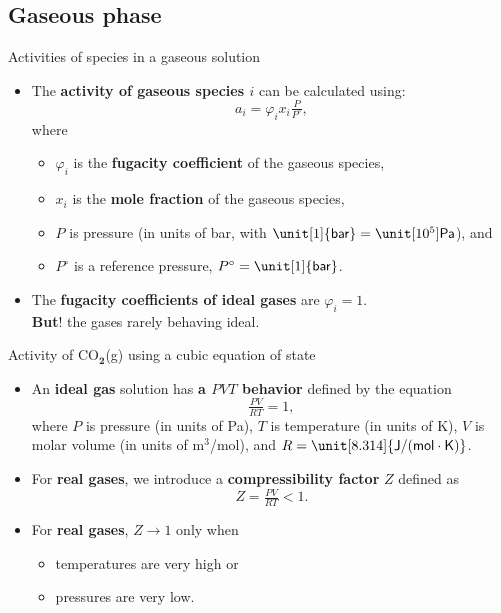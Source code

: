 \subsection{Gaseous phase}
%
%
\begin{frame}{Activities of species in a gaseous solution}
\begin{itemize}
\item The \alert{\textbf{activity of gaseous species $i$}} can be calculated using:
\[
\boxed{a_{i}=\varphi_{i}x_{i}\tfrac{P}{P^{\circ}}},
\]
where 
\begin{itemize}
\item $\varphi_{i}$ is the \textbf{fugacity coefficient} of the gaseous species,
\item $x_{i}$ is the \textbf{mole fraction} of the gaseous species,
\item $P$ is pressure (in units of bar, with $\unit[1]{\mathsf{bar}}=\unit[10^{5}]{\mathsf{Pa}}$),
and 
\item $P^{\circ}$ is a reference pressure, $P^{\circ}=\unit[1]{\mathsf{bar}}$.
\end{itemize}
\pause
\item The \textbf{fugacity coefficients of ideal gases} are $\varphi_{i}=1$. \\
\textbf{But}! the gases rarely behaving ideal.  
\end{itemize}
\end{frame}
%
%
\begin{frame}{Activity of CO$_{\boldsymbol{2}}$(g) using a cubic equation of state}
\begin{itemize}
\item An \textbf{ideal gas} solution has \alert{\textbf{a $PVT$ behavior}} defined by the equation
\[
\tfrac{PV}{RT}=1,
\]
where $P$ is pressure (in units of Pa), $T$ is temperature (in units
of K), $V$ is molar volume (in units of m$^{3}$/mol), and $R=\unit[8.314]{\mathsf{J/(mol\cdot K)}}$.
\pause
\item For \textbf{real gases}, we introduce a \alert{\textbf{compressibility factor}} $Z$ defined as
%
\[
Z=\tfrac{PV}{RT} < 1.
\]
\pause
\item For \textbf{real gases}, $Z \to 1$ only when
\begin{itemize}
\item temperatures are very high or
\item pressures are very low.
\end{itemize}
\end{itemize}
\end{frame}
